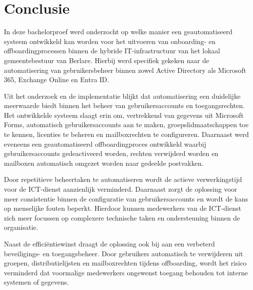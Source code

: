 
\chapter{Conclusie}%
\label{ch:conclusie}


In deze bachelorproef werd onderzocht op welke manier een geautomatiseerd systeem ontwikkeld kan worden voor het uitvoeren van onboarding- en offboardingprocessen binnen de hybride IT-infrastructuur van het lokaal gemeentebestuur van Berlare. Hierbij werd specifiek gekeken naar de automatisering van gebruikersbeheer binnen zowel Active Directory als Microsoft 365, Exchange Online en Entra ID.

Uit het onderzoek en de implementatie blijkt dat automatisering een duidelijke meerwaarde biedt binnen het beheer van gebruikersaccounts en toegangsrechten. Het ontwikkelde systeem slaagt erin om, vertrekkend van gegevens uit Microsoft Forms, automatisch gebruikersaccounts aan te maken, groepslidmaatschappen toe te kennen, licenties te beheren en mailboxrechten te configureren. Daarnaast werd eveneens een geautomatiseerd offboardingproces ontwikkeld waarbij gebruikersaccounts gedeactiveerd worden, rechten verwijderd worden en mailboxen automatisch omgezet worden naar gedeelde postvakken.

Door repetitieve beheertaken te automatiseren wordt de actieve verwerkingstijd voor de ICT-dienst aanzienlijk verminderd. Daarnaast zorgt de oplossing voor meer consistentie binnen de configuratie van gebruikersaccounts en wordt de kans op menselijke fouten beperkt. Hierdoor kunnen medewerkers van de ICT-dienst zich meer focussen op complexere technische taken en ondersteuning binnen de organisatie.

Naast de efficiëntiewinst draagt de oplossing ook bij aan een verbeterd beveiligings- en toegangsbeheer. Door gebruikers automatisch te verwijderen uit groepen, distributielijsten en mailboxrechten tijdens offboarding, wordt het risico verminderd dat voormalige medewerkers ongewenst toegang behouden tot interne systemen of gegevens.


